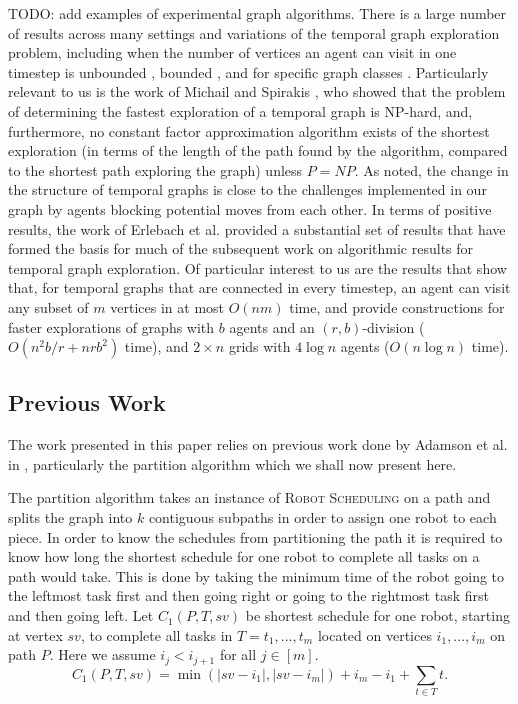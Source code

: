 \documentclass{DAC}
\begin{document}
{\color{red} TODO: add examples of experimental graph algorithms.}
There is a large number of results across many settings and variations of the temporal graph exploration problem, including when the number of vertices an agent can visit in one timestep is unbounded \cite{arrighi2023kernelizing,erlebach2022parameterized}, bounded \cite{erlebach_et_al:LIPIcs.ICALP.2019.141,erlebach2021temporal,michail2016traveling}, and for specific graph classes \cite{adamson2022faster,akrida2021temporal,bodlaender2019exploring,bumpus2023edge,deligkas2022optimizing,erlebach2022exploration,erlebach2018faster,taghian2020exploring}.
Particularly relevant to us is the work of Michail and Spirakis \cite{michail2016traveling}, who showed that the problem of determining the fastest exploration of a temporal graph is NP-hard, and, furthermore, no constant factor approximation algorithm exists of the shortest exploration (in terms of the length of the path found by the algorithm, compared to the shortest path exploring the graph) unless $P = NP$. As noted, the change in the structure of temporal graphs is close to the challenges implemented in our graph by agents blocking potential moves from each other.
In terms of positive results, the work of Erlebach et al. \cite{erlebach2021temporal} provided a substantial set of results that have formed the basis for much of the subsequent work on algorithmic results for temporal graph exploration. Of particular interest to us are the results that show that, for temporal graphs that are connected in every timestep, an agent can visit any subset of $m$ vertices in at most $O(n m)$ time, and provide constructions for faster explorations of graphs with $b$ agents and an $(r, b)$-division ($O(n^2 b / r + n r b^2)$ time), and $2 \times n$ grids with $4 \log n$ agents ($O(n \log n)$ time).

\subsection{Previous Work}%
The work presented in this paper relies on previous work done by Adamson et al. in \cite{adamson2024collisionfreerobotscheduling}, particularly the partition algorithm which we shall now present here. 

The partition algorithm takes an instance of \textsc{Robot Scheduling} on a path and splits the graph into $k$ contiguous subpaths in order to assign one robot to each piece.
In order to know the schedules from partitioning the path it is required to know how long the shortest schedule for one robot to complete all tasks on a path would take. 
This is done by taking the minimum time of the robot going to the leftmost task first and then going right or going to the rightmost task first and then going left. 
Let $C_1(P,T,sv)$ be shortest schedule for one robot, starting at vertex $sv$, to complete all tasks in $T = t_1,...,t_m$ located on vertices $i_1,...,i_m$ on path $P$.  Here we assume $i_j < i_{j+1}$ for all  $j \in [m]$.
\[C_1(P,T,sv) =\min(\vert sv - i_1 \vert, \vert sv - i_m \vert) + i_m - i_1 + \sum\limits_{t \in T} t.\]
\end{document}
